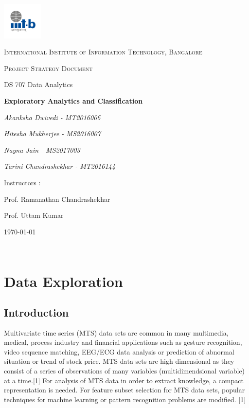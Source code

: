 \documentclass{article}
\begin{document}
\begin{titlepage}
	\centering
	\includegraphics[width=0.15\textwidth]{IIIT-B_logo.jpg}\par\vspace{1cm}
	{\scshape\LARGE International Institute of Information Technology, Bangalore \par}
	\vspace{1cm}
	{\scshape\Large Project Strategy Document\par}
	{\Large  DS 707 Data Analytics\par}
	\vspace{1.5cm}
	{\huge\bfseries Exploratory Analytics and Classification \par}
	\vspace{2cm}
	{\Large\itshape Akanksha Dwivedi - MT2016006\par}
	{\Large\itshape Hitesha Mukherjee - MS2016007\par}
	{\Large\itshape Nayna Jain - MS2017003\par}
	{\Large\itshape Tarini Chandrashekhar - MT2016144\par}
	\vfill
	Instructors : \par
	Prof. Ramanathan Chandrashekhar
	\par
	Prof. Uttam Kumar

	\vfill
	{\large \today\par}
\end{titlepage}

\newpage

\tableofcontents

\newpage
\justify

\

\section{Data Exploration}

\subsection {Introduction}
Multivariate time series (MTS) data sets are common in many multimedia, medical, process industry and financial applications such as gesture recognition, video sequence matching, EEG/ECG data analysis or prediction of abnormal situation or trend of stock price. MTS data sets are high dimensional as they consist of a series of observations of many variables (multidimendsional variable) at a time.[1]
For analysis of MTS data in order to extract knowledge, a compact representation is needed. For feature subset selection for MTS data sets, popular techniques for machine learning or pattern recognition problems are modified. [1] \newline
\end{document}
